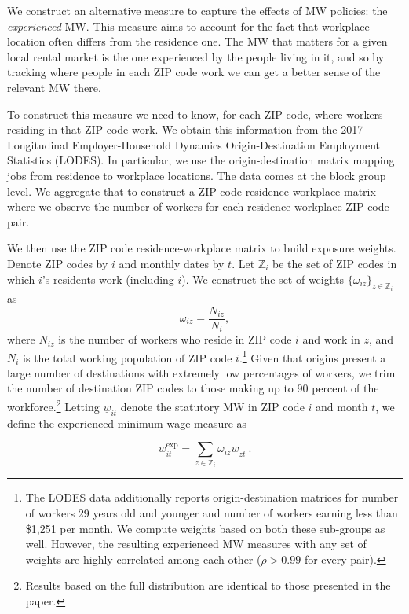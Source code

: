 We construct an alternative measure to capture the effects of MW policies: the 
\textit{experienced} MW. This measure aims to account for the fact that workplace location 
often differs from the residence one. The MW that matters for a given local rental market 
is the one experienced by the people living in it, and so by tracking where people in 
each ZIP code work we can get a better sense of the relevant MW there.

To construct this measure we need to know, for each ZIP code, where workers residing in 
that ZIP code work. We obtain this information from the 2017 Longitudinal Employer-Household 
Dynamics Origin-Destination Employment Statistics (LODES). In particular, we use the 
origin-destination matrix mapping jobs from residence to workplace locations. The data 
comes at the block group level. We aggregate that to construct a ZIP code residence-workplace 
matrix where we observe the number of workers for each residence-workplace ZIP code pair.

We then use the ZIP code residence-workplace matrix to build exposure weights. Denote 
ZIP codes by $i$ and monthly dates by $t$. Let $\mathds{Z}_i$ be the set of ZIP codes in 
which $i$'s residents work (including $i$). We construct the set of weights 
$\{\omega_{iz}\}_{z \in \mathds{Z}_i}$ as $$\omega_{iz} = \frac{N_{iz}}{N_i} , $$ where 
$N_{iz}$ is the number of workers who reside in ZIP code $i$ and work in $z$, and $N_i$ 
is the total working population of ZIP code $i$.\footnote{The LODES data additionally 
	reports origin-destination matrices for number of workers 29 years old and younger  
	and number of workers earning less than \$1,251 per month. We compute weights based 
	on both these sub-groups as well. However, the resulting experienced MW measures with
	any set of weights are highly correlated among each other ($\rho>0.99$ for every pair).} 
Given that origins present a large number of destinations with extremely low percentages of 
workers, we trim the number of destination ZIP codes to those making up to 90 percent of the 
workforce.\footnote{Results based on the full distribution are identical to those presented
	in the paper.} 
Letting $\underline{w}_{it}$ denote the statutory MW in ZIP code $i$ and month $t$, we 
define the experienced minimum wage measure as

\begin{equation}
	\underline{w}^{\text{exp}}_{it} = 
			\sum_{z \in \mathds{Z}_i} \omega_{iz} \underline{w}_{zt} \ . 
\end{equation}

